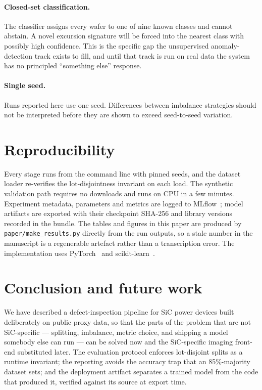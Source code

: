\documentclass[11pt,a4paper]{article}
\begin{document}
\paragraph{Closed-set classification.} The classifier assigns every wafer to
one of nine known classes and cannot abstain. A novel excursion signature will
be forced into the nearest class with possibly high confidence. This is the
specific gap the unsupervised anomaly-detection track exists to fill, and until
that track is run on real data the system has no principled ``something else''
response.

\paragraph{Single seed.} Runs reported here use one seed. Differences between
imbalance strategies should not be interpreted before they are shown to exceed
seed-to-seed variation.

\section{Reproducibility}
\label{sec:repro}

Every stage runs from the command line with pinned seeds, and the dataset
loader re-verifies the lot-disjointness invariant on each load. The synthetic
validation path requires no downloads and runs on CPU in a few minutes.
Experiment metadata, parameters and metrics are logged to
MLflow~\citep{mlflow}; model artifacts are exported with their checkpoint
SHA-256 and library versions recorded in the bundle. The tables and figures in
this paper are produced by \texttt{paper/make\_results.py} directly from the
run outputs, so a stale number in the manuscript is a regenerable artefact
rather than a transcription error. The implementation uses
PyTorch~\citep{paszke2019pytorch} and scikit-learn~\citep{pedregosa2011scikit}.

\section{Conclusion and future work}
\label{sec:future}

We have described a defect-inspection pipeline for SiC power devices built
deliberately on public proxy data, so that the parts of the problem that are
not SiC-specific --- splitting, imbalance, metric choice, and shipping a model
somebody else can run --- can be solved now and the SiC-specific imaging
front-end substituted later. The evaluation protocol enforces lot-disjoint
splits as a runtime invariant; the reporting avoids the accuracy trap that an
85\%-majority dataset sets; and the deployment artifact separates a trained
model from the code that produced it, verified against its source at export
time.
\end{document}
